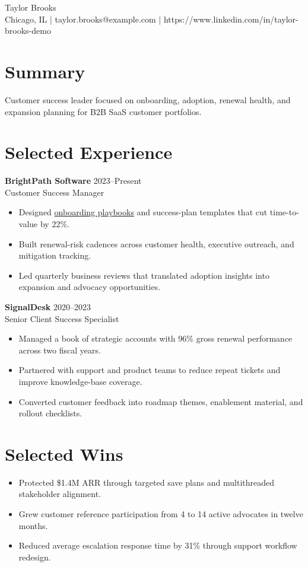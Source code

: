 \documentclass[10pt]{article}
\begin{document}
\begin{center}
  {\LARGE Taylor Brooks}\\
  Chicago, IL \quad | \quad taylor.brooks@example.com \quad | \quad
  https://www.linkedin.com/in/taylor-brooks-demo
\end{center}

\section*{Summary}
Customer success leader focused on onboarding, adoption, renewal health, and
expansion planning for B2B SaaS customer portfolios.

\section*{Selected Experience}
\textbf{BrightPath Software} \hfill 2023--Present\\
Customer Success Manager
\begin{itemize}
  \item Designed \underline{onboarding playbooks} and success-plan templates that cut time-to-value by 22\%.
  \item Built renewal-risk cadences across customer health, executive outreach, and mitigation tracking.
  \item Led quarterly business reviews that translated adoption insights into expansion and advocacy opportunities.
\end{itemize}

\textbf{SignalDesk} \hfill 2020--2023\\
Senior Client Success Specialist
\begin{itemize}
  \item Managed a book of strategic accounts with 96\% gross renewal performance across two fiscal years.
  \item Partnered with support and product teams to reduce repeat tickets and improve knowledge-base coverage.
  \item Converted customer feedback into roadmap themes, enablement material, and rollout checklists.
\end{itemize}

\section*{Selected Wins}
\begin{itemize}
  \item Protected \$1.4M ARR through targeted save plans and multithreaded stakeholder alignment.
  \item Grew customer reference participation from 4 to 14 active advocates in twelve months.
  \item Reduced average escalation response time by 31\% through support workflow redesign.
\end{itemize}
\end{document}
